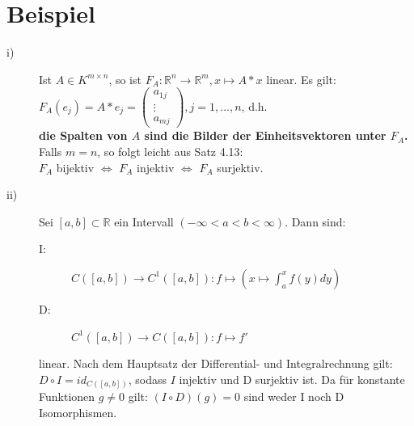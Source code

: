\documentclass{scrbook}
\begin{document}
\section{Beispiel}
\begin{description}
\item[i)] Ist $A \in K^{m \times n}$, so ist $F_A:\mathbb{R}^n \rightarrow \mathbb{R}^m, x \mapsto A*x$ linear. Es gilt: $F_A(e_j) = A*e_j = \left(
\begin{array}{c}
a_{1j}\\
\vdots\\
a_{mj}
\end{array}
\right), j=1,...,n$, d.h.\\\textbf{die Spalten von $A$ sind die Bilder der Einheitsvektoren unter $F_A$.}\\
Falls $m=n$, so folgt leicht aus Satz 4.13:\\$F_A$ bijektiv $\Leftrightarrow$ $F_A$ injektiv $\Leftrightarrow$ $F_A$ surjektiv.
\item[ii)] Sei $[a,b] \subset \mathbb{R}$ ein Intervall $(-\infty <a<b<\infty)$. Dann sind:
\begin{description}
\item[I:] $C ([a,b]) \rightarrow C^1 ([a,b]):f \mapsto (x\mapsto \int_a^x f(y) dy)$
\item[D:] $C^1([a,b]) \rightarrow C([a,b]): f\mapsto f'$
\end{description}
linear. Nach dem Hauptsatz der Differential- und Integralrechnung gilt:
$D\circ I = id_{C([a,b])}$, sodass $I$ injektiv und D surjektiv ist. Da für konstante Funktionen $g\neq 0$ gilt: $(I\circ D)(g)=0$ sind weder I noch D Isomorphismen.
\end{description}
\end{document}
